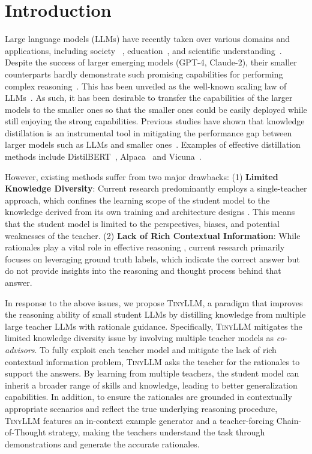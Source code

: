 \documentclass[sigconf,nonacm]{acmart}
\newcommand{\ours}{\textsc{TinyLLM}\xspace}
\begin{document}
\section{Introduction}
Large language models (LLMs) have recently taken over various domains and applications, including society ~\cite{rao2023makes}, education~\cite{zelikman2023generating}, and scientific understanding~\cite{beltagy2019scibert}. Despite the success of larger emerging models (GPT-4, Claude-2), their smaller counterparts hardly demonstrate such promising capabilities for performing complex reasoning~\cite{wei2022emergentabilities,chen2023gotta}. This has been unveiled as the well-known scaling law of LLMs~\cite{kaplan2020scalinglaws}. As such, it has been desirable to transfer the capabilities of the larger models to the smaller ones so that the smaller ones could be easily deployed while still enjoying the strong capabilities. Previous studies have shown that knowledge distillation is an instrumental tool in mitigating the performance gap between larger models such as LLMs and smaller ones~\cite{wan2023efficient, hsieh-etal-2023-distilling, kd_survey}. Examples of effective distillation methods include DistilBERT~\cite{sanh2019distilbert}, Alpaca~\cite{alpaca} and Vicuna~\cite{zheng2023judging}.


However, existing methods suffer from two major drawbacks: (1) \textbf{Limited Knowledge Diversity}: Current research predominantly employs a single-teacher approach, which confines the learning scope of the student model to the knowledge derived from its own training and architecture designs \cite{ho2022largelanguagemodels,magister2022teachingsmall,li2023symbolicchain,wang2022pinto}. This means that the student model is limited to the perspectives, biases, and potential weaknesses of the teacher. (2) \textbf{Lack of Rich Contextual Information}: While rationales play a vital role in effective reasoning \cite{wei2022chainofthought,kojima2022zero}, current research primarily focuses on leveraging ground truth labels, which indicate the correct answer but do not provide insights into the reasoning and thought process behind that answer.


In response to the above issues, we propose \ours, a paradigm that improves the reasoning ability of small student LLMs by distilling knowledge from multiple large teacher LLMs with rationale guidance. Specifically, \ours mitigates the limited knowledge diversity issue by involving multiple teacher models as \textit{co-advisors}. To fully exploit each teacher model and mitigate the lack of rich contextual information problem, \ours asks the teacher for the rationales to support the answers. By learning from multiple teachers, the student model can inherit a broader range of skills and knowledge, leading to better generalization capabilities. In addition, to ensure the rationales are grounded in contextually appropriate scenarios and reflect the true underlying reasoning procedure, \ours features an in-context example generator and a teacher-forcing Chain-of-Thought strategy, making the teachers understand the task through demonstrations and generate the accurate rationales.
\end{document}
